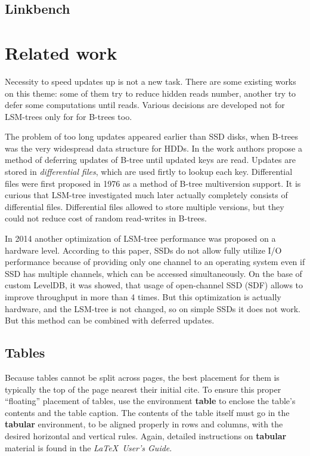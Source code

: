\documentclass{vldb}
\begin{document}
\subsection{Linkbench}

\section{Related work}
Necessity to speed updates up is not a new task. There are some existing works
on this theme: some of them try to reduce hidden reads number, another try to
defer some computations until reads. Various decisions are developed not for
LSM-trees only for for B-trees too.

The problem of too long updates appeared earlier than SSD disks, when B-trees
was the very widespread data structure for HDDs. In the work
\cite{Edward:incremental_update} authors propose a method of deferring updates
of B-tree until updated keys are read. Updates are stored in
\textit{differential files}, which are used firtly to lookup each key.
Differential files were first proposed in 1976 \cite{Lohman:differential_files}
as a method of B-tree multiversion support. It is curious that LSM-tree
investigated much later actually completely consists of differential files.
Differential files allowed to store multiple versions, but they could not reduce
cost of random read-writes in B-trees.

In 2014 another optimization of LSM-tree performance was proposed
\cite{Wang:open_channel_ssd} on a hardware level. According to this paper, SSDs
do not allow fully utilize I/O performance because of providing only one channel
to an operating system even if SSD has multiple channels, which can be accessed
simultaneously. On the base of custom LevelDB, it was showed, that usage of
open-channel SSD (SDF) allows to improve throughput in more than 4 times. But
this optimization is actually hardware, and the LSM-tree is not changed, so on
simple SSDs it does not work. But this method can be combined with deferred
updates.

\subsection{Tables}
Because tables cannot be split across pages, the best
placement for them is typically the top of the page
nearest their initial cite.  To
ensure this proper ``floating'' placement of tables, use the
environment \textbf{table} to enclose the table's contents and
the table caption.  The contents of the table itself must go
in the \textbf{tabular} environment, to
be aligned properly in rows and columns, with the desired
horizontal and vertical rules.  Again, detailed instructions
on \textbf{tabular} material
is found in the \textit{\LaTeX\ User's Guide}.
\end{document}

